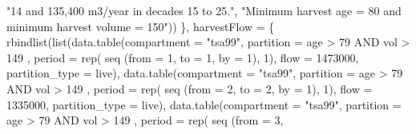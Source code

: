 \documentclass[
  letterpaper,
  DIV=11,
  numbers=noendperiod]{scrreprt}
\newenvironment{Shaded}{\begin{snugshade}}{\end{snugshade}}
\newcommand{\AttributeTok}[1]{\textcolor[rgb]{0.40,0.45,0.13}{#1}}
\newcommand{\DecValTok}[1]{\textcolor[rgb]{0.68,0.00,0.00}{#1}}
\newcommand{\FunctionTok}[1]{\textcolor[rgb]{0.28,0.35,0.67}{#1}}
\newcommand{\NormalTok}[1]{\textcolor[rgb]{0.00,0.23,0.31}{#1}}
\newcommand{\StringTok}[1]{\textcolor[rgb]{0.13,0.47,0.30}{#1}}
\begin{document}
\begin{Shaded}
\begin{Highlighting}[]
                                   \StringTok{"14 and 135,400 m3/year in decades 15 to 25."}\NormalTok{,}
                                   \StringTok{"Minimum harvest age = 80 and minimum harvest volume = 150"}\NormalTok{))}
\NormalTok{  \},}
  \AttributeTok{harvestFlow =}\NormalTok{ \{}
    \FunctionTok{rbindlist}\NormalTok{(}\FunctionTok{list}\NormalTok{(}\FunctionTok{data.table}\NormalTok{(}\AttributeTok{compartment =} \StringTok{"tsa99"}\NormalTok{,}
                              \AttributeTok{partition =} \StringTok{\textquotesingle{} age \textgreater{} 79 AND vol \textgreater{} 149 \textquotesingle{}}\NormalTok{, }
                              \AttributeTok{period =} \FunctionTok{rep}\NormalTok{( }\FunctionTok{seq}\NormalTok{ (}\AttributeTok{from =} \DecValTok{1}\NormalTok{,}
                                                 \AttributeTok{to =} \DecValTok{1}\NormalTok{, }
                                                 \AttributeTok{by =} \DecValTok{1}\NormalTok{),}
                                            \DecValTok{1}\NormalTok{), }
                              \AttributeTok{flow =} \DecValTok{1473000}\NormalTok{, }
                              \AttributeTok{partition\_type =} \StringTok{\textquotesingle{}live\textquotesingle{}}\NormalTok{),}
                   \FunctionTok{data.table}\NormalTok{(}\AttributeTok{compartment =} \StringTok{"tsa99"}\NormalTok{,}
                              \AttributeTok{partition =} \StringTok{\textquotesingle{} age \textgreater{} 79 AND vol \textgreater{} 149 \textquotesingle{}}\NormalTok{, }
                              \AttributeTok{period =} \FunctionTok{rep}\NormalTok{( }\FunctionTok{seq}\NormalTok{ (}\AttributeTok{from =} \DecValTok{2}\NormalTok{,}
                                                 \AttributeTok{to =} \DecValTok{2}\NormalTok{, }
                                                 \AttributeTok{by =} \DecValTok{1}\NormalTok{),}
                                            \DecValTok{1}\NormalTok{), }
                              \AttributeTok{flow =} \DecValTok{1335000}\NormalTok{, }
                              \AttributeTok{partition\_type =} \StringTok{\textquotesingle{}live\textquotesingle{}}\NormalTok{),}
                   \FunctionTok{data.table}\NormalTok{(}\AttributeTok{compartment =} \StringTok{"tsa99"}\NormalTok{,}
                              \AttributeTok{partition =} \StringTok{\textquotesingle{} age \textgreater{} 79 AND vol \textgreater{} 149 \textquotesingle{}}\NormalTok{, }
                              \AttributeTok{period =} \FunctionTok{rep}\NormalTok{( }\FunctionTok{seq}\NormalTok{ (}\AttributeTok{from =} \DecValTok{3}\NormalTok{,}

\end{Highlighting}
\end{Shaded}
\end{document}
